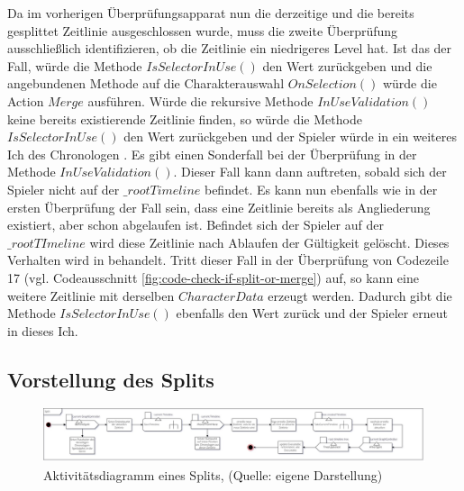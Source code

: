 Da im vorherigen Überprüfungsapparat nun die derzeitige und die bereits gesplittet Zeitlinie ausgeschlossen wurde, muss die zweite Überprüfung ausschließlich identifizieren, ob die Zeitlinie ein niedrigeres Level hat. Ist das der Fall, würde die Methode $IsSelectorInUse()$ den Wert  zurückgeben und die angebundenen Methode auf die Charakterauswahl $OnSelection()$ würde die Action $Merge$ ausführen. Würde die rekursive Methode $InUseValidation()$ keine bereits existierende Zeitlinie finden, so würde die Methode $IsSelectorInUse()$ den Wert  zurückgeben und der Spieler würde in ein weiteres Ich des Chronologen . Es gibt einen Sonderfall bei der Überprüfung in der Methode $InUseValidation()$. Dieser Fall kann dann auftreten, sobald sich der Spieler nicht auf der $\_rootTimeline$ befindet. Es kann nun ebenfalls wie in der ersten Überprüfung der Fall sein, dass eine Zeitlinie bereits als Angliederung existiert, aber schon abgelaufen ist. Befindet sich der Spieler auf der $\_rootTImeline$ wird diese Zeitlinie nach Ablaufen der Gültigkeit gelöscht. Dieses Verhalten wird in  behandelt. Tritt dieser Fall in der Überprüfung von Codezeile 17 (vgl. Codeausschnitt \ref{fig:code-check-if-split-or-merge}) auf, so kann eine weitere Zeitlinie mit derselben $CharacterData$ erzeugt werden. Dadurch gibt die Methode $IsSelectorInUse()$ ebenfalls den Wert  zurück und der Spieler  erneut in dieses Ich.

\subsection{Vorstellung des Splits}\label{sec:split_prototype}

\begin{figure}[ht]
\centering
\includegraphics[width=1\linewidth]{content/pictures/Split_uml.jpg}
\caption{Aktivitätsdiagramm eines Splits, (Quelle: eigene Darstellung)}
\label{fig:split-uml}
\end{figure}

